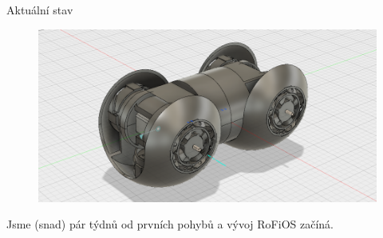 \documentclass{beamer}
\begin{document}
\begin{frame}{Aktuální stav}
    \begin{figure}
        \centering
        \includegraphics[width=\textwidth]{img/rofi3}
    \end{figure}

    Jsme (snad) pár týdnů od prvních pohybů a vývoj RoFiOS začíná.
\end{frame}
\end{document}
